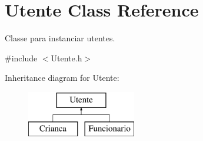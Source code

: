 \hypertarget{class_utente}{}\section{Utente Class Reference}
\label{class_utente}


Classe para instanciar utentes.  




{\ttfamily \#include $<$Utente.\+h$>$}

Inheritance diagram for Utente\+:\begin{figure}[H]
\begin{center}
\leavevmode
\includegraphics[height=2.000000cm]{class_utente}
\end{center}
\end{figure}
